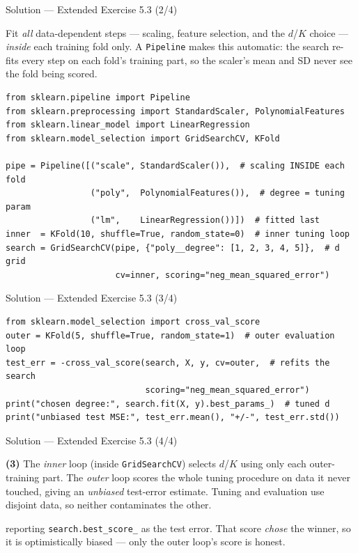 \documentclass[aspectratio=169,11pt]{beamer}
\begin{document}
\begin{frame}[fragile]{Solution --- Extended Exercise 5.3 (2/4)}
  \begin{solutionbox}
    Fit \emph{all} data-dependent steps --- scaling, feature selection,
    and the $d$/$K$ choice --- \emph{inside} each training fold only. A
    \texttt{Pipeline} makes this automatic: the search re-fits every step
    on each fold's training part, so the scaler's mean and SD never see
    the fold being scored.
  \end{solutionbox}
  \begin{lstlisting}
from sklearn.pipeline import Pipeline
from sklearn.preprocessing import StandardScaler, PolynomialFeatures
from sklearn.linear_model import LinearRegression
from sklearn.model_selection import GridSearchCV, KFold

pipe = Pipeline([("scale", StandardScaler()),  # scaling INSIDE each fold
                 ("poly",  PolynomialFeatures()),  # degree = tuning param
                 ("lm",    LinearRegression())])  # fitted last
inner  = KFold(10, shuffle=True, random_state=0)  # inner tuning loop
search = GridSearchCV(pipe, {"poly__degree": [1, 2, 3, 4, 5]},  # d grid
                      cv=inner, scoring="neg_mean_squared_error")
  \end{lstlisting}
\end{frame}

\begin{frame}[fragile]{Solution --- Extended Exercise 5.3 (3/4)}
  \begin{lstlisting}
from sklearn.model_selection import cross_val_score
outer = KFold(5, shuffle=True, random_state=1)  # outer evaluation loop
test_err = -cross_val_score(search, X, y, cv=outer,  # refits the search
                            scoring="neg_mean_squared_error")
print("chosen degree:", search.fit(X, y).best_params_)  # tuned d
print("unbiased test MSE:", test_err.mean(), "+/-", test_err.std())
  \end{lstlisting}
\end{frame}

\begin{frame}{Solution --- Extended Exercise 5.3 (4/4)}
  \begin{solutionbox}
    \textbf{(3)} The \emph{inner} loop (inside \texttt{GridSearchCV})
    selects $d$/$K$ using only each outer-training part. The \emph{outer}
    loop scores the whole tuning procedure on data it never touched,
    giving an \emph{unbiased} test-error estimate. Tuning and evaluation
    use disjoint data, so neither contaminates the other.
  \end{solutionbox}
  \begin{mistake}
    reporting \texttt{search.best\_score\_} as
    the test error. That score \emph{chose} the winner, so it is
    optimistically biased --- only the outer loop's score is honest.
  \end{mistake}
\end{frame}
\end{document}
